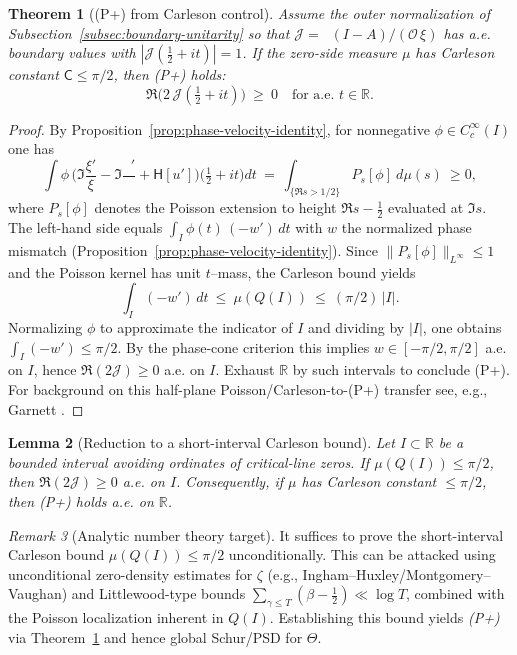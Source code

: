 \documentclass[11pt]{article}
\newtheorem{theorem}{Theorem}
\newtheorem{lemma}[theorem]{Lemma}
\theoremstyle{definition}
\theoremstyle{remark}
\newtheorem{remark}[theorem]{Remark}
\newcommand{\R}{\mathbb{R}}
\DeclareMathOperator{\dettwo}{det_2}
\begin{document}
\begin{theorem}[(P+) from Carleson control]\label{thm:Pplus-from-Carleson}
Assume the outer normalization of Subsection~\ref{subsec:boundary-unitarity} so that \(\mathcal J=\dettwo(I-A)/(\mathcal O\,\xi)\) has a.e. boundary values with \(|\mathcal J(\tfrac12+it)|=1\). If the zero-side measure \(\mu\) has Carleson constant \(\mathsf C\le \pi/2\), then \emph{(P+)} holds:
\[
 \Re\big(2\,\mathcal J(\tfrac12+it)\big)\ \ge\ 0\quad\text{for a.e. }t\in\R.
\]
\end{theorem}
\begin{proof}
By Proposition~\ref{prop:phase-velocity-identity}, for nonnegative \(\phi\in C_c^\infty(I)\) one has
\[
 \int\!\phi\,\Big(\Im\frac{\xi'}{\xi}-\Im\frac{\dettwo'}{\dettwo}+\mathsf H[u']\Big)\Big(\tfrac12+it\Big)dt\ =\ \int_{\{\Re s>1/2\}} P_{s}\![\phi] \ d\mu(s)\ \ge 0,
\]
where \(P_{s}[\phi]\) denotes the Poisson extension to height \(\Re s-\tfrac12\) evaluated at \(\Im s\). The left-hand side equals \(\int_I \phi(t)\,(-w')\,dt\) with \(w\) the normalized phase mismatch (Proposition~\ref{prop:phase-velocity-identity}). Since \(\|P_{s}[\phi]\|_{L^\infty}\le 1\) and the Poisson kernel has unit \(t\)–mass, the Carleson bound yields
\[
 \int_I (-w')\,dt\ \le\ \mu(Q(I))\ \le\ (\pi/2)\,|I|.
\]
Normalizing \(\phi\) to approximate the indicator of \(I\) and dividing by \(|I|\), one obtains \(\int_I (-w')\le \pi/2\). By the phase-cone criterion this implies \(w\in[-\pi/2,\pi/2]\) a.e. on \(I\), hence \(\Re(2\mathcal J)\ge 0\) a.e. on \(I\). Exhaust \(\R\) by such intervals to conclude (P+). For background on this half-plane Poisson/Carleson-to-(P+) transfer see, e.g., Garnett \cite[Ch.~IV]{Garnett}.
\end{proof}
\begin{lemma}[Reduction to a short-interval Carleson bound]\label{lem:HP-Carleson}
Let \(I\subset\R\) be a bounded interval avoiding ordinates of critical-line zeros. If \(\mu(Q(I))\le \pi/2\), then \(\Re(2\mathcal J)\ge 0\) a.e. on \(I\). Consequently, if \(\mu\) has Carleson constant \(\le \pi/2\), then \emph{(P+)} holds a.e. on \(\R\).
\end{lemma}
\begin{remark}[Analytic number theory target]
It suffices to prove the short-interval Carleson bound \(\mu(Q(I))\le \pi/2\) unconditionally. This can be attacked using unconditional zero-density estimates for \(\zeta\) (e.g., Ingham–Huxley/Montgomery–Vaughan) and Littlewood-type bounds \(\sum_{\gamma\le T}(\beta-\tfrac12)\ll \log T\), combined with the Poisson localization inherent in \(Q(I)\). Establishing this bound yields \emph{(P+)} via Theorem~\ref{thm:Pplus-from-Carleson} and hence global Schur/PSD for \(\Theta\).
\end{remark}
\end{document}
